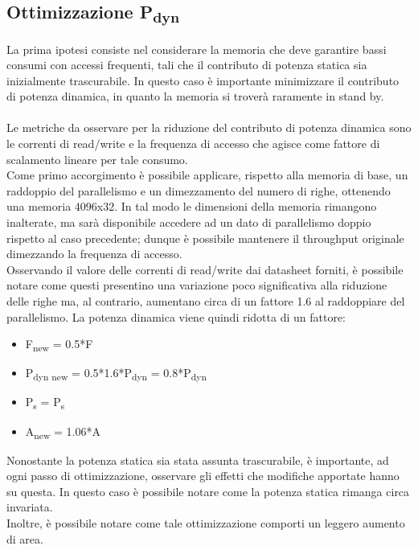 \documentclass[11pt,  english, makeidx, a4paper, titlepage, oneside]{book}
\begin{document}
\subsection{Ottimizzazione P\textsubscript{dyn}}
La prima ipotesi consiste nel considerare la memoria che deve garantire bassi consumi con accessi frequenti, tali che il contributo di potenza statica sia inizialmente trascurabile. In questo caso è importante minimizzare il contributo di potenza dinamica, in quanto la memoria si troverà raramente in stand by.
\\\\
Le metriche da osservare per la riduzione del contributo di potenza dinamica sono le correnti di read/write e la frequenza di accesso che agisce come fattore di scalamento lineare per tale consumo.
\\
Come primo accorgimento è possibile applicare, rispetto alla memoria di base, un raddoppio del parallelismo e un dimezzamento del numero di righe, ottenendo una memoria 4096x32. In tal modo le dimensioni della memoria rimangono inalterate, ma sarà disponibile accedere ad un dato di parallelismo doppio rispetto al caso precedente; dunque è possibile mantenere il throughput originale dimezzando la frequenza di accesso.
\\
Osservando il valore delle correnti di read/write dai datasheet forniti, è possibile notare come questi presentino una variazione poco significativa alla riduzione delle righe ma, al contrario, aumentano circa di un fattore 1.6 al raddoppiare del parallelismo. La potenza dinamica viene quindi ridotta di un fattore:
\\
\begin{itemize}
\item F\textsubscript{new} = 0.5*F
\item P\textsubscript{dyn new} = 0.5*1.6*P\textsubscript{dyn} = 0.8*P\textsubscript{dyn}
\item P\textsubscript{s} = P\textsubscript{s}
\item A\textsubscript{new} = 1.06*A
\end{itemize}
\vspace{0.3cm}
Nonostante la potenza statica sia stata assunta trascurabile, è importante, ad ogni passo di ottimizzazione, osservare gli effetti che modifiche apportate hanno su questa. In questo caso è possibile notare come la potenza statica rimanga circa invariata.
\\
Inoltre, è possibile notare come tale ottimizzazione comporti un leggero aumento di area.
\\\\\
\end{document}
